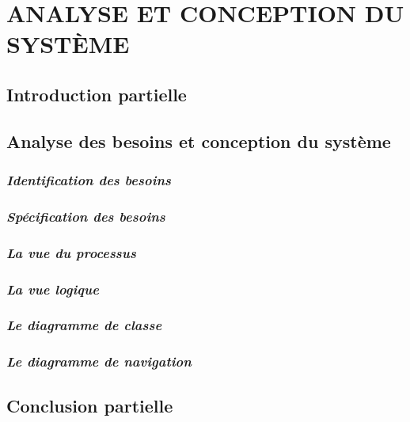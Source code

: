 \chapter[Analyse et conception du système]{ANALYSE ET CONCEPTION DU SYSTÈME}
    \section[Introduction partielle]{Introduction partielle}
    \section[short]{Analyse des besoins et conception du système}
        \subsection[Identification des besoins]{\textit{Identification des besoins}}
        \subsection[Spécification des besoins]{\textit{Spécification des besoins}}
        \subsection[La vue du processus]{\textit{La vue du processus}}
        \subsection[La vue logique]{\textit{La vue logique}}
        \subsection[Le diagramme de classe]{\textit{Le diagramme de classe}}
        \subsection[Le diagramme de navigation]{\textit{Le diagramme de navigation}}
    \section[Conclusion partielle]{Conclusion partielle}